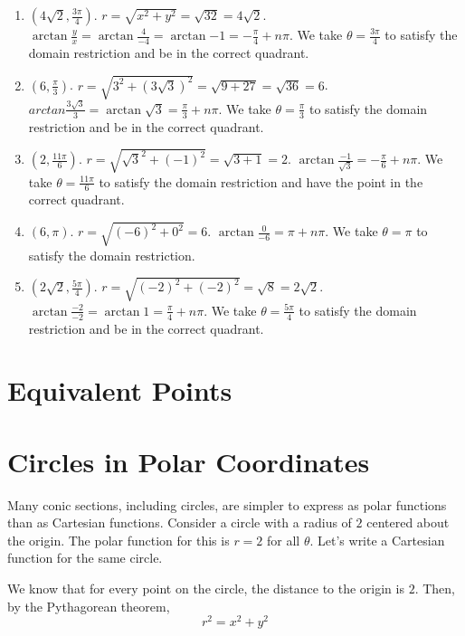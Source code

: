 \begin{Answer}[ref = convert2]
\begin{enumerate}
\item $(4\sqrt{2}, \frac{3\pi}{4})$. $r = \sqrt{x^2 + y^2} = \sqrt{32} = 4
\sqrt{2}$. $\arctan{\frac{y}{x}} = \arctan{\frac{4}{-4}} = \arctan{-1} = -
\frac{\pi}{4} + n\pi$. We take $\theta = \frac{3\pi}{4}$ to satisfy the domain 
restriction and be in the correct quadrant. 
\item $(6, \frac{\pi}{3})$. $r = \sqrt{3^2 + \left( 3\sqrt{3} \right)^2} = 
\sqrt{9 + 27} = \sqrt{36} = 6$. $arctan{\frac{3\sqrt{3}}{3}} = \arctan{\sqrt{
3}} = \frac{\pi}{3} + n\pi$. We take $\theta = \frac{\pi}{3}$ to satisfy the 
domain restriction and be in the correct quadrant. 
\item $(2,\frac{11\pi}{6})$. $r = \sqrt{\sqrt{3}^2 + (-1)^2} = \sqrt{3 + 1} = 
2$. $\arctan{\frac{-1}{\sqrt{3}}} = -\frac{\pi}{6} + n\pi$. We take $\theta = 
\frac{11\pi}{6}$ to satisfy the domain restriction and have the point in the 
correct quadrant. 
\item $(6, \pi)$. $r = \sqrt{(-6)^2 + 0^2} = 6$. $\arctan{\frac{0}{-6}} = \pi 
+ n\pi$. We take $\theta = \pi$ to satisfy the domain restriction. 
\item $(2\sqrt{2}, \frac{5\pi}{4})$. $r = \sqrt{(-2)^2 + (-2)^2} = \sqrt{8} = 
2\sqrt{2}$. $\arctan{\frac{-2}{-2}} = \arctan{1} = \frac{\pi}{4} + n\pi$. We 
take $\theta = \frac{5\pi}{4}$ to satisfy the domain restriction and be in the 
correct quadrant. 
\end{enumerate}
\end{Answer}

\section{Equivalent Points}

\section{Circles in Polar Coordinates}
Many conic sections, including circles, are simpler to express as polar 
functions than as Cartesian functions. Consider a circle with a radius of $2$ 
centered about the origin. The polar function for this is $r = 2$ for all 
$\theta$. Let's write a Cartesian function for the same circle. 

We know that for every point on the circle, the distance to the origin is $2$. 
Then, by the Pythagorean theorem, 
$$r^2 = x^2 + y^2$$

